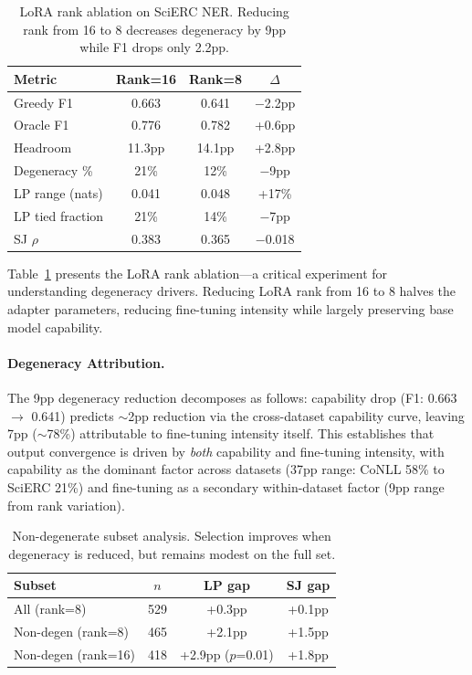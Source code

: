 \documentclass[11pt]{article}
\begin{document}
\begin{table}[t]
\centering
\small
\caption{LoRA rank ablation on SciERC NER. Reducing rank from 16 to 8 decreases degeneracy by 9pp while F1 drops only 2.2pp.}
\label{tab:lora_ablation}
\begin{tabular}{lccc}
\toprule
Metric & Rank=16 & Rank=8 & $\Delta$ \\
\midrule
Greedy F1 & 0.663 & 0.641 & $-$2.2pp \\
Oracle F1 & 0.776 & 0.782 & +0.6pp \\
Headroom & 11.3pp & 14.1pp & +2.8pp \\
Degeneracy \% & 21\% & 12\% & $-$9pp \\
LP range (nats) & 0.041 & 0.048 & +17\% \\
LP tied fraction & 21\% & 14\% & $-$7pp \\
SJ $\rho$ & 0.383 & 0.365 & $-$0.018 \\
\bottomrule
\end{tabular}
\end{table}

Table~\ref{tab:lora_ablation} presents the LoRA rank ablation---a critical experiment for understanding degeneracy drivers. Reducing LoRA rank from 16 to 8 halves the adapter parameters, reducing fine-tuning intensity while largely preserving base model capability.

\paragraph{Degeneracy Attribution.} The 9pp degeneracy reduction decomposes as follows: capability drop (F1: 0.663 $\rightarrow$ 0.641) predicts $\sim$2pp reduction via the cross-dataset capability curve, leaving 7pp ($\sim$78\%) attributable to fine-tuning intensity itself. This establishes that output convergence is driven by \emph{both} capability and fine-tuning intensity, with capability as the dominant factor across datasets (37pp range: CoNLL 58\% to SciERC 21\%) and fine-tuning as a secondary within-dataset factor (9pp range from rank variation).

\begin{table}[t]
\centering
\small
\caption{Non-degenerate subset analysis. Selection improves when degeneracy is reduced, but remains modest on the full set.}
\label{tab:nondegen}
\begin{tabular}{lccc}
\toprule
Subset & $n$ & LP gap & SJ gap \\
\midrule
All (rank=8) & 529 & +0.3pp & +0.1pp \\
Non-degen (rank=8) & 465 & +2.1pp & +1.5pp \\
Non-degen (rank=16) & 418 & +2.9pp ($p$=0.01) & +1.8pp \\
\bottomrule
\end{tabular}
\end{table}
\end{document}
